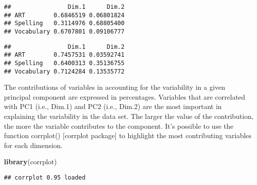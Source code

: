 \documentclass[
]{article}
\newenvironment{Shaded}{\begin{snugshade}}{\end{snugshade}}
\newcommand{\FunctionTok}[1]{\textcolor[rgb]{0.13,0.29,0.53}{\textbf{#1}}}
\newcommand{\NormalTok}[1]{#1}
\newcommand{\SpecialCharTok}[1]{\textcolor[rgb]{0.81,0.36,0.00}{\textbf{#1}}}
\newcommand{\StringTok}[1]{\textcolor[rgb]{0.31,0.60,0.02}{#1}}
\begin{document}
\begin{Shaded}
\end{Shaded}

\begin{verbatim}
##                Dim.1      Dim.2
## ART        0.6846519 0.06801824
## Spelling   0.3114976 0.68805400
## Vocabulary 0.6707801 0.09106777
\end{verbatim}

\begin{Shaded}
\end{Shaded}

\begin{verbatim}
##                Dim.1      Dim.2
## ART        0.7457531 0.03592741
## Spelling   0.6400313 0.35136755
## Vocabulary 0.7124284 0.13535772
\end{verbatim}

The contributions of variables in accounting for the variability in a
given principal component are expressed in percentages. Variables that
are correlated with PC1 (i.e., Dim.1) and PC2 (i.e., Dim.2) are the most
important in explaining the variability in the data set. The larger the
value of the contribution, the more the variable contributes to the
component. It's possible to use the function corrplot() {[}corrplot
package{]} to highlight the most contributing variables for each
dimension.

\begin{Shaded}
\begin{Highlighting}[]
\FunctionTok{library}\NormalTok{(}\StringTok{\textquotesingle{}corrplot\textquotesingle{}}\NormalTok{)}
\end{Highlighting}
\end{Shaded}

\begin{verbatim}
## corrplot 0.95 loaded
\end{verbatim}

\begin{Shaded}
\end{Shaded}
\end{document}
